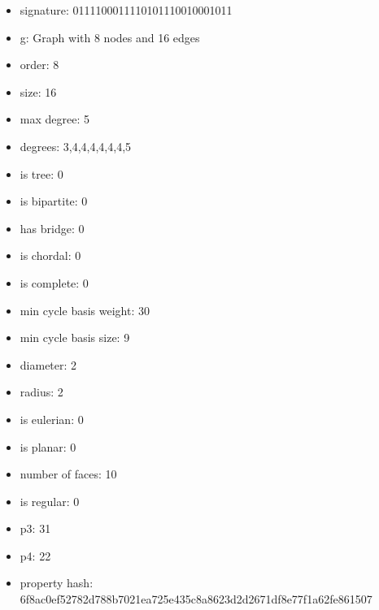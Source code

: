 \begin{itemize}
\item signature: 0111100011110101110010001011
\item g: Graph with 8 nodes and 16 edges
\item order: 8
\item size: 16
\item max degree: 5
\item degrees: 3,4,4,4,4,4,4,5
\item is tree: 0
\item is bipartite: 0
\item has bridge: 0
\item is chordal: 0
\item is complete: 0
\item min cycle basis weight: 30
\item min cycle basis size: 9
\item diameter: 2
\item radius: 2
\item is eulerian: 0
\item is planar: 0
\item number of faces: 10
\item is regular: 0
\item p3: 31
\item p4: 22
\item property hash: 6f8ac0ef52782d788b7021ea725e435c8a8623d2d2671df8e77f1a62fe861507
\end{itemize}
\newpage
\begin{figure}
\end{figure}
